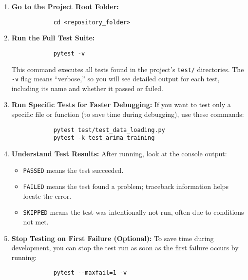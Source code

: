 \begin{enumerate}
	\item \textbf{Go to the Project Root Folder:}
	\begin{framed}
		\begin{verbatim}
			cd <repository_folder>
		\end{verbatim}
	\end{framed}
	
	\item \textbf{Run the Full Test Suite:}
	\begin{framed}
		\begin{verbatim}
			pytest -v
		\end{verbatim}
	\end{framed}
	This command executes all tests found in the project’s \texttt{test/} directories. The \texttt{-v} flag means “verbose,” so you will see detailed output for each test, including its name and whether it passed or failed.
	
	\item \textbf{Run Specific Tests for Faster Debugging:}
	If you want to test only a specific file or function (to save time during debugging), use these commands:
	\begin{framed}
		\begin{verbatim}
			pytest test/test_data_loading.py
			pytest -k test_arima_training
		\end{verbatim}
	\end{framed}
	
	\item \textbf{Understand Test Results:}
	After running, look at the console output:
	\begin{itemize}
		\item \texttt{PASSED} means the test succeeded.
		\item \texttt{FAILED} means the test found a problem; traceback information helps locate the error.
		\item \texttt{SKIPPED} means the test was intentionally not run, often due to conditions not met.
	\end{itemize}
	
	\item \textbf{Stop Testing on First Failure (Optional):}
	To save time during development, you can stop the test run as soon as the first failure occurs by running:
	\begin{framed}
		\begin{verbatim}
			pytest --maxfail=1 -v
		\end{verbatim}
	\end{framed}
\end{enumerate}

